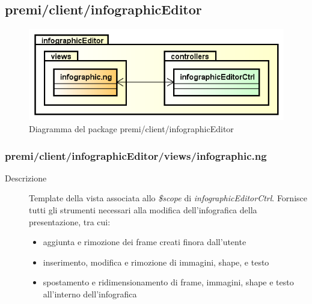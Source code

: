 \clearpage
\subsection{premi/client/infographicEditor}
\begin{figure}[h]
\begin{center}
\includegraphics[scale=0.55]{img/diapkg/infographicEditor.png}
\caption{Diagramma del package premi/client/infographicEditor}
\end{center}
\end{figure}



\subsubsection{premi/client/infographicEditor/views/infographic.ng}

\begin{description}
\item[Descrizione] \hfill
	Template della vista associata allo \textit{\$scope} di \textit{infographicEditorCtrl}. Fornisce tutti gli strumenti necessari alla modifica dell'infografica della presentazione, tra cui:
	\begin{itemize}
			\item aggiunta e rimozione dei frame creati finora dall'utente
			\item inserimento, modifica e rimozione di immagini, shape, e testo
			\item spostamento e ridimensionamento di frame, immagini, shape  e testo all'interno dell'infografica
	\end{itemize}
\end{description}



















